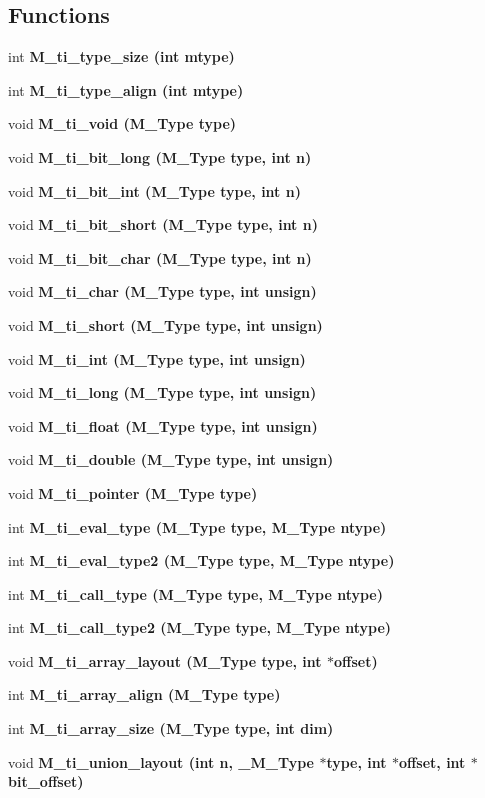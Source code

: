 \subsection*{Functions}
\begin{CompactItemize}
\item 
int \bf{M\_\-ti\_\-type\_\-size} (int mtype)
\item 
int \bf{M\_\-ti\_\-type\_\-align} (int mtype)
\item 
void \bf{M\_\-ti\_\-void} (\bf{M\_\-Type} type)
\item 
void \bf{M\_\-ti\_\-bit\_\-long} (\bf{M\_\-Type} type, int n)
\item 
void \bf{M\_\-ti\_\-bit\_\-int} (\bf{M\_\-Type} type, int n)
\item 
void \bf{M\_\-ti\_\-bit\_\-short} (\bf{M\_\-Type} type, int n)
\item 
void \bf{M\_\-ti\_\-bit\_\-char} (\bf{M\_\-Type} type, int n)
\item 
void \bf{M\_\-ti\_\-char} (\bf{M\_\-Type} type, int unsign)
\item 
void \bf{M\_\-ti\_\-short} (\bf{M\_\-Type} type, int unsign)
\item 
void \bf{M\_\-ti\_\-int} (\bf{M\_\-Type} type, int unsign)
\item 
void \bf{M\_\-ti\_\-long} (\bf{M\_\-Type} type, int unsign)
\item 
void \bf{M\_\-ti\_\-float} (\bf{M\_\-Type} type, int unsign)
\item 
void \bf{M\_\-ti\_\-double} (\bf{M\_\-Type} type, int unsign)
\item 
void \bf{M\_\-ti\_\-pointer} (\bf{M\_\-Type} type)
\item 
int \bf{M\_\-ti\_\-eval\_\-type} (\bf{M\_\-Type} type, \bf{M\_\-Type} ntype)
\item 
int \bf{M\_\-ti\_\-eval\_\-type2} (\bf{M\_\-Type} type, \bf{M\_\-Type} ntype)
\item 
int \bf{M\_\-ti\_\-call\_\-type} (\bf{M\_\-Type} type, \bf{M\_\-Type} ntype)
\item 
int \bf{M\_\-ti\_\-call\_\-type2} (\bf{M\_\-Type} type, \bf{M\_\-Type} ntype)
\item 
void \bf{M\_\-ti\_\-array\_\-layout} (\bf{M\_\-Type} type, int $\ast$offset)
\item 
int \bf{M\_\-ti\_\-array\_\-align} (\bf{M\_\-Type} type)
\item 
int \bf{M\_\-ti\_\-array\_\-size} (\bf{M\_\-Type} type, int dim)
\item 
void \bf{M\_\-ti\_\-union\_\-layout} (int n, \bf{\_\-M\_\-Type} $\ast$type, int $\ast$offset, int $\ast$bit\_\-offset)

\end{CompactItemize}
